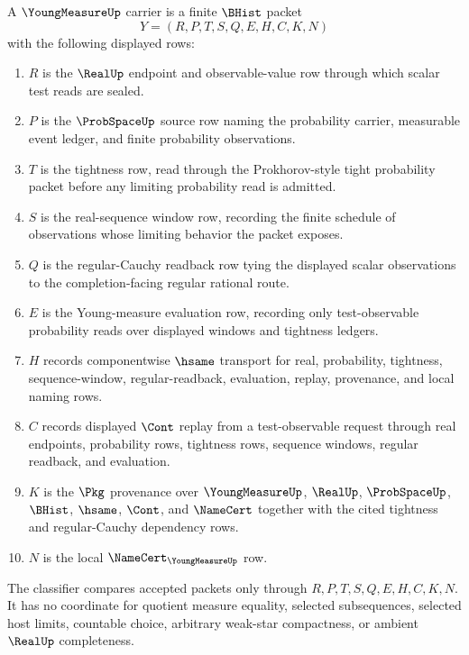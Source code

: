 \begin{definition}
\label{def:young-measure-carrier}
A $\YoungMeasureUp$ carrier is a finite $\BHist$ packet
$$
Y=(R,P,T,S,Q,E,H,C,K,N)
$$
with the following displayed rows:
\begin{enumerate}
\item $R$ is the $\RealUp$ endpoint and observable-value row through which scalar test reads are sealed.
\item $P$ is the $\ProbSpaceUp$ source row naming the probability carrier, measurable event ledger, and finite probability observations.
\item $T$ is the tightness row, read through the Prokhorov-style tight probability packet before any limiting probability read is admitted.
\item $S$ is the real-sequence window row, recording the finite schedule of observations whose limiting behavior the packet exposes.
\item $Q$ is the regular-Cauchy readback row tying the displayed scalar observations to the completion-facing regular rational route.
\item $E$ is the Young-measure evaluation row, recording only test-observable probability reads over displayed windows and tightness ledgers.
\item $H$ records componentwise $\hsame$ transport for real, probability, tightness, sequence-window, regular-readback, evaluation, replay, provenance, and local naming rows.
\item $C$ records displayed $\Cont$ replay from a test-observable request through real endpoints, probability rows, tightness rows, sequence windows, regular readback, and evaluation.
\item $K$ is the $\Pkg$ provenance over $\YoungMeasureUp$, $\RealUp$, $\ProbSpaceUp$, $\BHist$, $\hsame$, $\Cont$, and $\NameCert$ together with the cited tightness and regular-Cauchy dependency rows.
\item $N$ is the local $\NameCert_{\YoungMeasureUp}$ row.
\end{enumerate}
The classifier compares accepted packets only through $R,P,T,S,Q,E,H,C,K,N$. It has no coordinate for quotient measure equality, selected subsequences, selected host limits, countable choice, arbitrary weak-star compactness, or ambient $\RealUp$ completeness.
\end{definition}

